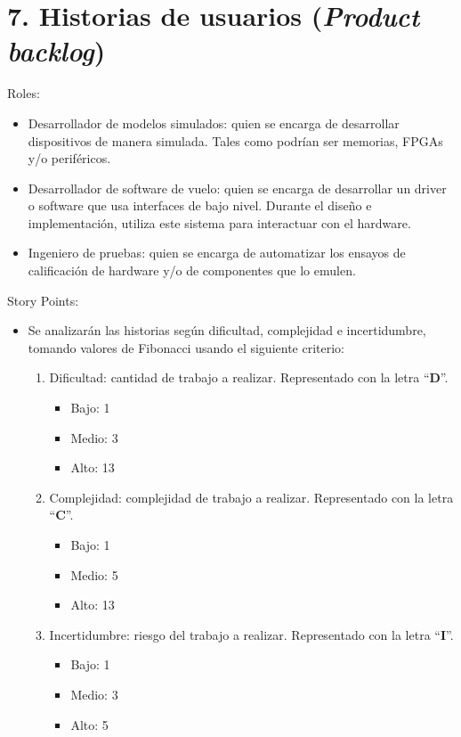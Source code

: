\section{7. Historias de usuarios (\textit{Product backlog})}
\label{sec:7-historias-de-usuarios-product-backlog}


Roles:

\begin{itemize}
\item Desarrollador de modelos simulados: quien se encarga de desarrollar dispositivos de manera simulada. Tales como podrían ser memorias, FPGAs y/o periféricos.
\item Desarrollador de software de vuelo: quien se encarga de desarrollar un driver o software que usa interfaces de bajo nivel. Durante el diseño e implementación, utiliza este sistema para interactuar con el hardware.
\item Ingeniero de pruebas: quien se encarga de automatizar los ensayos de calificación de hardware y/o de componentes que lo emulen.
\end{itemize}

Story Points:

\begin{itemize}
\item Se analizarán las historias según dificultad, complejidad e incertidumbre, tomando valores de Fibonacci usando el siguiente criterio:
  \begin{enumerate}
  \item Dificultad: cantidad de trabajo a realizar. Representado con la letra ``\textbf{D}''.

	  \begin{itemize}
	  \item Bajo: 1
	  \item Medio: 3
	  \item Alto: 13
	  \end{itemize}

  \item Complejidad: complejidad de trabajo a realizar. Representado con la letra ``\textbf{C}''.

	  \begin{itemize}
	  \item Bajo: 1
	  \item Medio: 5
	  \item Alto: 13
	  \end{itemize}

  \item Incertidumbre: riesgo del trabajo a realizar. Representado con la letra ``\textbf{I}''.

	  \begin{itemize}
	  \item Bajo: 1
	  \item Medio: 3
	  \item Alto: 5
	  \end{itemize}

  \end{enumerate}

\end{itemize}

